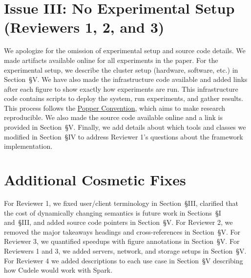 \documentclass[onecolumn,conference]{IEEEtran}
\begin{document}
\section*{Issue III: No Experimental Setup (Reviewers 1, 2, and 3)}

We apologize for the omission of experimental setup and source code details.
We made artifacts available online for all experiments in the paper. For the
experimental setup, we describe the cluster setup (hardware, software, etc.) in
Section~{\S}V.  We have also made the infrastructure code available and added
links after each figure to show exactly how experiments are run.  This
infrastructure code contains scripts to deploy the system, run experiments, and
gather results.  This process follows the \href{http://falsifiable.us/}{Popper
Convention}, which aims to make research reproducible.  We also made the source
code available online and a link is provided in Section~{\S}V. Finally, we add
details about which tools and classes we modified in Section~{\S}IV to address
Reviewer 1's questions about the framework implementation.

\section*{Additional Cosmetic Fixes}

For Reviewer 1, we fixed user/client terminology in Section~{\S}III,
clarified that the cost of dynamically changing semantics is future work in
Sections~{\S}I and~{\S}III, and added source code pointers in Section~{\S}V.
For Reviewer 2, we removed the major takeaways headings and cross-references in
Section~{\S}V. For Reviewer 3, we quantified speedups with figure annotations
in Section~{\S}V. For Reviewers 1 and 3, we added servers, network, and storage
setups in Section~{\S}V. For Reviewer 4 we added descriptions to each use case
in Section~{\S}V describing how Cudele would work with Spark. 
\end{document}
